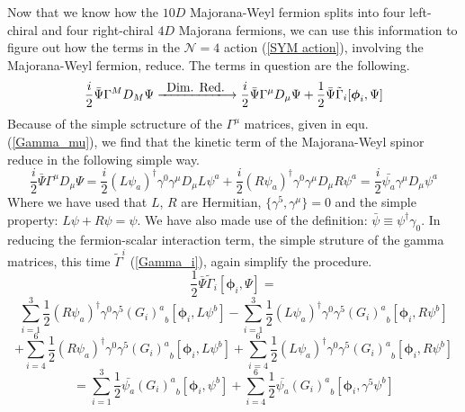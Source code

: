 Now that we know how the $10D$ Majorana-Weyl fermion splits into four left-chiral and four right-chiral $4D$ Majorana fermions, we can use this information to figure out how the terms in the $\mathcal{N} = 4$ action (\ref{SYM action}), involving the Majorana-Weyl fermion, reduce. The terms in question are the following.
%
%
\begin{equation}
\frac{i}{2} \bar{\Psi} \Gamma^M D_M \Psi
%
\xlongrightarrow{\makebox[2cm]{ Dim. Red. }}
%
\frac{i}{2} \bar{\Psi} \Gamma^\mu D_{\mu} \Psi
+
\frac{1}{2} \bar{\Psi} \tilde{\Gamma}_i [\boldsymbol{\phi}_i, \Psi]
\end{equation}
%
%
Because of the simple sctructure of the $\Gamma^\mu$ matrices, given in equ. (\ref{Gamma_mu}), we find that the kinetic term of the Majorana-Weyl spinor reduce in the following simple way.
%
%
\begin{equation}
\frac{i}{2} \bar{\Psi} \Gamma^\mu D_{\mu} \Psi
=
\frac{i}{2} (L \psi_a)^\dagger \gamma^0 \gamma^\mu D_{\mu} L \psi^a
+
\frac{i}{2} (R \psi_a)^\dagger \gamma^0 \gamma^\mu D_{\mu} R \psi^a
=
\frac{i}{2} \bar{\psi_a} \gamma^\mu D_{\mu} \psi^a
\end{equation}
%
%
Where we have used that $L$, $R$ are Hermitian, $\{ \gamma^5, \gamma^\mu \} = 0$ and the simple property: $L \psi + R \psi = \psi$. We have also made use of the definition: $\bar{\psi} \equiv \psi^\dagger \gamma_0$. In reducing the fermion-scalar interaction term, the simple struture of the gamma matrices, this time  $\tilde{\Gamma}^i$ (\ref{Gamma_i}), again simplify the procedure.
%
%
\begin{equation*}
\frac{1}{2} \bar{\Psi} \tilde{\Gamma}_i [\boldsymbol{\phi}_i, \Psi]
=
\end{equation*}
%
%
\begin{equation*}
\sum_{i=1}^3 \frac{1}{2} (R \psi_a)^\dagger \gamma^0 \gamma^5 {(G_i)^a}_b [\boldsymbol{\phi}_i, L \psi^b]
-
\sum_{i=1}^3 \frac{1}{2} (L \psi_a)^\dagger \gamma^0 \gamma^5 {(G_i)^a}_b [\boldsymbol{\phi}_i, R \psi^b]
\end{equation*}
%
%
\begin{equation*}
+
\sum_{i=4}^6 \frac{1}{2} (R \psi_a)^\dagger \gamma^0 \gamma^5 {(G_i)^a}_b [\boldsymbol{\phi}_i, L \psi^b]
+
\sum_{i=4}^6 \frac{1}{2} (L \psi_a)^\dagger \gamma^0 \gamma^5 {(G_i)^a}_b [\boldsymbol{\phi}_i, R \psi^b]
\end{equation*}
%
%
\begin{equation}
=
\sum_{i=1}^3 \frac{1}{2} \bar{\psi_a} {(G_i)^a}_b [\boldsymbol{\phi}_i, \psi^b]
+
\sum_{i=4}^6 \frac{1}{2} \bar{\psi_a} {(G_i)^a}_b [\boldsymbol{\phi}_i, \gamma^5 \psi^b]
\end{equation}
